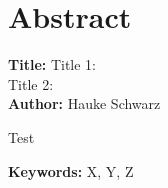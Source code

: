 \chapter*{Abstract}

\noindent
\textbf{Title:} Title 1: \\
Title 2: \\ 
\textbf{Author:} Hauke Schwarz
\vspace{1em}


Test


\vspace{3em}

\textbf{Keywords:} X, Y, Z \\